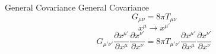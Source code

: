 \documentclass[xcolor=dvipsnames]{beamer}
\begin{document}
	\begin{frame}{General Covariance}
		General Covariance
		\pause
		\Large
		\[
		G_{\mu\nu} = 8\pi T_{\mu\nu}
		\]
		\pause
		\[
		x^{\mu} \rightarrow x^{\mu'}
		\]
		\pause
		\[
		G_{\mu'\nu'}\frac{\partial x^{\mu'}}{\partial x^{\mu}}\frac{\partial x^{\nu'}}{\partial x^{\nu}} = 8 \pi T_{\mu'\nu'}\frac{\partial x^{\mu'}}{\partial x^{\mu}}\frac{\partial x^{\nu'}}{\partial x^{\nu}}
		\]
	\end{frame}
\end{document}
